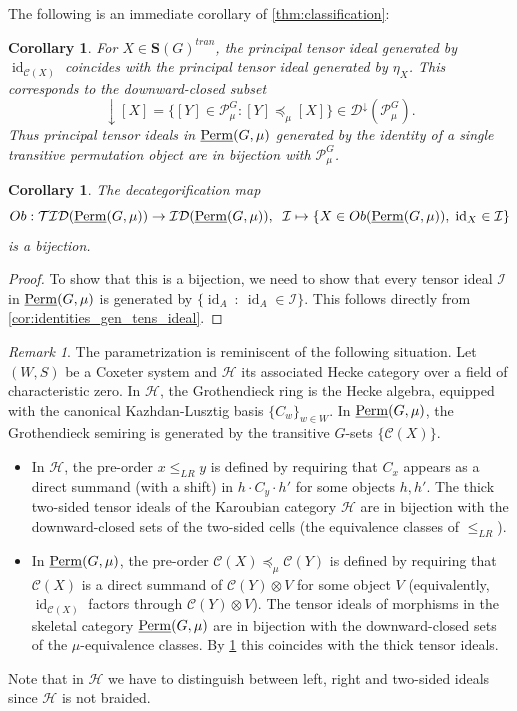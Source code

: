 \documentclass[11pt,a4paper]{amsart}
\theoremstyle{plain}%
\newtheorem{corollary}[lemma]{Corollary}
\theoremstyle{definition}
\theoremstyle{remark}
\newtheorem{remark}[lemma]{Remark}
\newcommand{\id}{\operatorname{id}}
\newcommand{\Perm}{\underline{{\rm Perm}}}
\newcommand{\TID}{\mathcal{TID}}
\newcommand{\ID}{\mathcal{ID}}
\newcommand{\Down}{\mathcal{D}^{\downarrow}}
\begin{document}
The following is an immediate corollary of \cref{thm:classification}:
\begin{corollary}\label{cor:principal-class}
    For $X\in \mathbf{S}(G)^{tran}$, the principal tensor ideal
generated by $\id_{\mathcal{C}(X)}$ coincides with the principal tensor ideal
generated by $\eta_X$. This corresponds to the downward-closed subset 
\[
  \downarrow[X]
  =\{[Y]\in \mathcal{P}_{\mu}^{G}:[Y]\preceq_\mu[X]\} \in \Down(\mathcal{P}^G_\mu) .
\]
Thus principal tensor ideals in $\Perm(G, \mu)$ generated by the identity of a single transitive permutation object are in bijection with $\mathcal{P}^G_\mu$.
\end{corollary}


\begin{corollary}\label{cor:tensor_ideals_are_thick} The decategorification map \[ Ob: \TID(\Perm(G, \mu)) \to \ID(\Perm(G, \mu)), \;\; \mathcal{I}\mapsto \{X\in Ob(\Perm(G, \mu)), \; \id_X\in \mathcal{I}\}\] is a bijection.
\end{corollary}

\begin{proof}
To show that this is a bijection, we need to show that every tensor ideal $\mathcal{I}$ in $\Perm(G, \mu)$ is generated by $\{\id_A~:~ \id_A\in\mathcal{I}\}$. This follows directly from \cref{cor:identities_gen_tens_ideal}.
\end{proof}




\begin{remark} The parametrization is reminiscent of the following situation. Let $(W,S)$ be a Coxeter system and $\mathcal{H}$ its associated Hecke category over a field of characteristic zero. In $\mathcal{H}$, the Grothendieck ring is the Hecke algebra, equipped with the canonical Kazhdan-Lusztig  basis $\{C_w\}_{w \in W}$. In $\Perm(G, \mu)$, the Grothendieck semiring is generated by the transitive $G$-sets $\{\mathcal{C}(X)\}$.
 \begin{itemize}
        \item In $\mathcal{H}$, the pre-order $x \le_{LR} y$ is defined by requiring that $C_x$ appears as a direct summand (with a shift) in $h \cdot C_y \cdot h'$ for some objects $h, h'$. The thick two-sided tensor ideals of the Karoubian category $\mathcal{H}$ are in bijection with the downward-closed sets of the two-sided cells (the equivalence classes of $\le_{LR}$).
\item In $\Perm(G, \mu)$, the pre-order $\mathcal{C}(X) \preceq_\mu \mathcal{C}(Y)$ is defined by requiring that $\mathcal{C}(X)$ is a direct summand of $\mathcal{C}(Y) \otimes V$ for some object $V$ (equivalently, $\id_{\mathcal{C}(X)}$ factors through $\mathcal{C}(Y) \otimes V$). The tensor ideals of morphisms in the skeletal category $\Perm(G, \mu)$ are in bijection with the downward-closed sets of the $\mu$-equivalence classes. By \cref{cor:tensor_ideals_are_thick} this coincides with the thick tensor ideals.
\end{itemize}

Note that in $\mathcal{H}$ we have to distinguish between left, right and two-sided ideals since $\mathcal{H}$ is not braided.
\end{remark}
\end{document}
